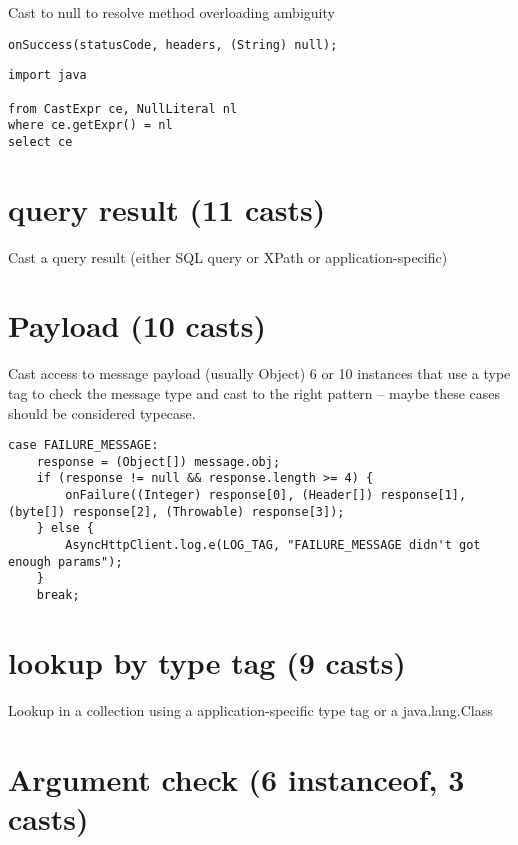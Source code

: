 Cast to null to resolve method overloading ambiguity 

\lstset{language=java,label= ,caption= ,captionpos=b,numbers=none}
\begin{lstlisting}
onSuccess(statusCode, headers, (String) null); 
\end{lstlisting}

\lstset{language=ql,label= ,caption= ,captionpos=b,numbers=none}
\begin{lstlisting}
import java

from CastExpr ce, NullLiteral nl
where ce.getExpr() = nl
select ce
\end{lstlisting}

\section{query result (11 casts)}
\label{sec:org0cf6a6b}
Cast a query result (either SQL query or XPath or application-specific) 

\section{Payload (10 casts)}
\label{sec:orgfa0891e}
Cast access to message payload (usually Object) 
6 or 10 instances that use a type tag to check the message type and cast to the right pattern -- maybe these cases should be considered typecase. 

\lstset{language=java,label= ,caption= ,captionpos=b,numbers=none}
\begin{lstlisting}
case FAILURE_MESSAGE: 
    response = (Object[]) message.obj; 
    if (response != null && response.length >= 4) { 
        onFailure((Integer) response[0], (Header[]) response[1], (byte[]) response[2], (Throwable) response[3]); 
    } else { 
        AsyncHttpClient.log.e(LOG_TAG, "FAILURE_MESSAGE didn't got enough params"); 
    } 
    break; 
\end{lstlisting}

\section{lookup by type tag (9 casts)}
\label{sec:orgc2859d6}
Lookup in a collection using a application-specific type tag or a java.lang.Class 

\section{Argument check (6 instanceof, 3 casts)}
\label{sec:org777530a}

